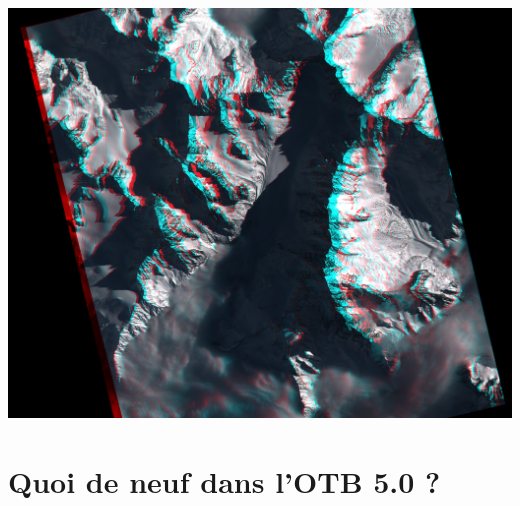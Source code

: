 \documentclass[8pt]{beamer}
\begin{document}
\vspace*{-6.5mm}    
\begin{frame}[plain]
\hspace*{-11mm}
    \includegraphics[keepaspectratio,width=1.005\paperwidth,height=1.1\paperheight]{images/argentiere_anaglyphe.png}
\end{frame} 

\section{Quoi de neuf dans l'OTB 5.0 ?}
\end{document}
